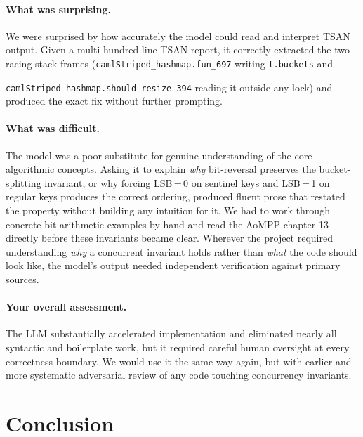 \documentclass[11pt,a4paper]{article}
\begin{document}
\paragraph{What was surprising.}

We were surprised by how accurately the model could read and interpret TSAN
output. Given a multi-hundred-line TSAN report, it correctly extracted the two
racing stack frames (\texttt{camlStriped\_hashmap.fun\_697} writing
\texttt{t.buckets} and 


\texttt{camlStriped\_hashmap.should\_resize\_394} reading
it outside any lock) and produced the exact fix without further prompting.

\paragraph{What was difficult.}
The model was a poor substitute for genuine understanding of the core
algorithmic concepts. Asking it to explain \emph{why} bit-reversal preserves
the bucket-splitting invariant, or why forcing LSB\,=\,0 on sentinel keys and
LSB\,=\,1 on regular keys produces the correct ordering, produced fluent prose
that restated the property without building any intuition for it. We had to
work through concrete bit-arithmetic examples by hand and read the AoMPP chapter 13~\cite{AoMPP} directly before these invariants became
clear. Wherever the project
required understanding \emph{why} a concurrent invariant holds rather than
\emph{what} the code should look like, the model's output needed independent
verification against primary sources.

\paragraph{Your overall assessment.}
The LLM substantially accelerated implementation and eliminated nearly all
syntactic and boilerplate work, but it required careful human oversight at
every correctness boundary. We would use it the same way again, but with
earlier and more systematic adversarial review of any code touching
concurrency invariants.

\section{Conclusion}
\label{sec:conclusion}
\end{document}
